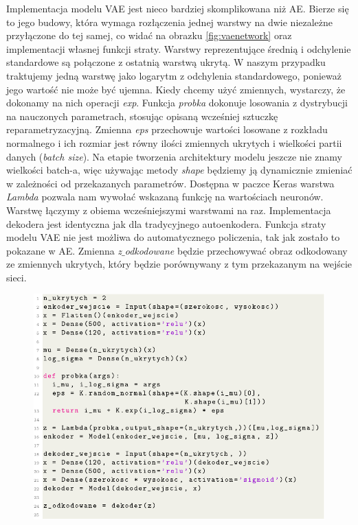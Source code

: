 \documentclass[a4paper,12pt,oneside]{book} %
\begin{document}
Implementacja modelu VAE jest nieco bardziej skomplikowana niż AE. Bierze się to jego budowy, która wymaga rozłączenia jednej warstwy na dwie niezależne przyłączone do tej samej, co widać na obrazku \ref{fig:vaenetwork} oraz implementacji własnej funkcji straty. Warstwy reprezentujące średnią i odchylenie standardowe są połączone z ostatnią warstwą ukrytą. W naszym przypadku traktujemy jedną warstwę jako logarytm z odchylenia standardowego, ponieważ jego wartość nie może być ujemna. Kiedy chcemy użyć zmiennych, wystarczy, że dokonamy na nich operacji \textit{exp}. Funkcja \textit{probka} dokonuje losowania z dystrybucji na nauczonych parametrach, stosując opisaną wcześniej sztuczkę reparametryzacyjną. Zmienna \textit{eps} przechowuje wartości losowane z rozkładu normalnego i ich rozmiar jest równy ilości zmiennych ukrytych i wielkości partii danych (\textit{batch size}). Na etapie tworzenia architektury modelu jeszcze nie znamy wielkości batch-a, więc używając metody \textit{shape} będziemy ją dynamicznie zmieniać w zależności od przekazanych parametrów. Dostępna w paczce Keras warstwa \textit{Lambda} pozwala nam wywołać wskazaną funkcję na wartościach neuronów. Warstwę łączymy z obiema wcześniejszymi warstwami na raz. Implementacja dekodera jest identyczna jak dla tradycyjnego autoenkodera. Funkcja straty modelu VAE nie jest możliwa do automatycznego policzenia, tak jak zostało to pokazane w AE. Zmienna \textit{z$\_$odkodowane} będzie przechowywać obraz odkodowany ze zmiennych ukrytych, który będzie porównywany z tym przekazanym na wejście sieci.

\begin{figure}[h!]
	\centering
	\includegraphics[width=\linewidth]{modelvae.pdf}
\end{figure}
\end{document}
